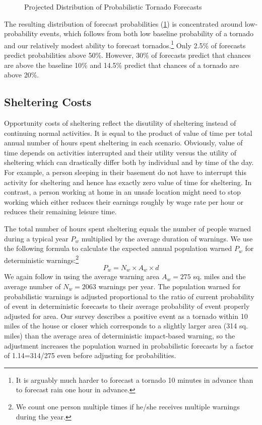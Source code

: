 \documentclass{ametsocV6.1}
\begin{document}
\begin{figure}[!htbp]
\begin{subfigure}{0.45\linewidth}
\end{subfigure}\caption{Projected Distribution of Probabilistic Tornado Forecasts}\label{prob_forecast}
\end{figure}

The resulting distribution of forecast probabilities (\ref{prob_forecast}) is concentrated around low-probability events, which follows from both low baseline probability of a tornado and our relatively modest ability to forecast tornados.\footnote{It is arguably much harder to forecast a tornado 10 minutes in advance than to forecast rain one hour in advance.} Only 2.5\% of forecasts predict probabilities above 50\%. However, 30\% of forecasts predict that chances are above the baseline 10\% and 14.5\% predict that chances of a tornado are above 20\%.


\vspace{10pt}
\subsection{Sheltering Costs}
Opportunity costs of sheltering reflect the disutility of sheltering instead of continuing normal activities. It is equal to the product of value of time per total annual number of hours  spent sheltering in each scenario. Obviously, value of time depends on activities interrupted and their utility versus the utility of sheltering which can drastically differ both by individual and by time of the day. For example, a person sleeping in their basement do not have to interrupt this activity for sheltering and hence has exactly zero value of time for sheltering. In contrast, a person working at home in an unsafe location might need to stop working which either reduces their earnings roughly by wage rate per hour or reduces their remaining leisure time.  

The total number of hours spent sheltering equals the number of people warned during a typical year $P_w$ multiplied by the average duration of warnings. We use the following formula to calculate the expected annual population warned $P_w$ for deterministic warnings:\footnote{We count one person multiple times if he/she receives multiple warnings during the year.}
$$P_w= N_w \times A_w \times d $$
We again follow \citet{howard_firm_2021} in using the average warning area $A_w=275$ sq. miles and the average number of $N_w=2063$ warnings per year. The population warned for probabilistic warnings is adjusted proportional to the ratio of current probability of event in deterministic forecasts to their average probability of event properly adjusted for area. Our survey describes a positive event as a tornado within 10 miles of the house or closer which corresponds to a slightly larger area (314 sq. miles) than the average area of deterministic impact-based warning, so the adjustment increases the population warned in probabilistic forecasts by a factor of 1.14=314/275 even before adjusting for probabilities.
\end{document}
